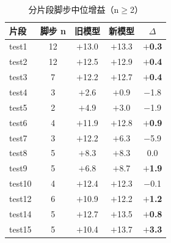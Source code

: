 \begin{table}[htbp]\centering
\caption{分片段脚步中位增益（n$\geq$2）}\label{tab:nm_clip}
{\footnotesize\begin{threeparttable}
\begin{tabular}{lcccc}\toprule
片段 & 脚步 n & 旧模型 & 新模型 & $\Delta$ \\
\midrule
test1 & 12 & $+$13.0 & $+$13.3 & \textbf{$+$0.3} \\
test2 & 12 & $+$12.5 & $+$12.9 & \textbf{$+$0.4} \\
test3 & 7 & $+$12.2 & $+$12.7 & \textbf{$+$0.4} \\
test4 & 3 & $+$2.6 & $+$0.9 & $-$1.8 \\
test5 & 2 & $+$4.9 & $+$3.0 & $-$1.9 \\
test6 & 4 & $+$11.9 & $+$12.8 & \textbf{$+$0.9} \\
test7 & 3 & $+$12.2 & $+$6.3 & $-$5.9 \\
test8 & 5 & $+$8.3 & $+$8.3 & 0.0 \\
test9 & 5 & $+$6.8 & $+$8.7 & \textbf{$+$1.9} \\
test10 & 4 & $+$12.4 & $+$12.3 & $-$0.1 \\
test12 & 6 & $+$10.9 & $+$12.2 & \textbf{$+$1.2} \\
test14 & 5 & $+$12.7 & $+$13.5 & \textbf{$+$0.8} \\
test15 & 5 & $+$10.4 & $+$13.7 & \textbf{$+$3.3} \\
\bottomrule\end{tabular}
\end{threeparttable}}
\end{table}
